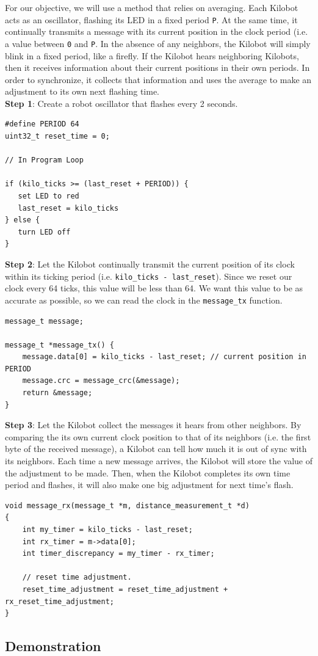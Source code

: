 \documentclass{report}[12pt]
\begin{document}
\noindent For our objective, we will use a method that relies on averaging. Each Kilobot acts as an oscillator, flashing its LED in a fixed period \texttt{P}. At the same time, it continually transmits a message with its current position in the clock period (i.e. a value between \texttt{0} and \texttt{P}. In the absence of any neighbors, the Kilobot will simply blink in a fixed period, like a firefly. If the Kilobot hears neighboring Kilobots, then it receives information about their current positions in their own periods. In order to synchronize, it collects that information and uses the average to make an adjustment to its own next flashing time. \\

\noindent \textbf{Step 1}: Create a robot oscillator that flashes every 2 seconds.
\begin{verbatim}
#define PERIOD 64
uint32_t reset_time = 0;

// In Program Loop

if (kilo_ticks >= (last_reset + PERIOD)) {
   set LED to red
   last_reset = kilo_ticks
} else {
   turn LED off
}
\end{verbatim}

\noindent \textbf{Step  2}: Let the Kilobot continually transmit the current position of its clock within its ticking period (i.e. \texttt{kilo\_ticks - last\_reset}). Since we reset our clock every 64 ticks, this value will be less than 64. We want this value to be as accurate as possible, so we can read the clock in the \texttt{message\_tx} function. 
\begin{verbatim}
message_t message;

message_t *message_tx() {
    message.data[0] = kilo_ticks - last_reset; // current position in PERIOD
    message.crc = message_crc(&message);
    return &message;
}
\end{verbatim}

\noindent \textbf{Step 3}: Let the Kilobot collect the messages it hears from other neighbors. 
By comparing the its own current clock position to that of its neighbors (i.e. the first byte of the received message), a Kilobot can tell how much it is out of sync with its neighbors. Each time a new message arrives, the Kilobot will store the value of the adjustment to be made. Then, when the Kilobot completes its own time period and flashes, it will also make one big adjustment for next time's flash.

\begin{verbatim}
void message_rx(message_t *m, distance_measurement_t *d)
{
    int my_timer = kilo_ticks - last_reset;
    int rx_timer = m->data[0];
    int timer_discrepancy = my_timer - rx_timer;
    
    // reset time adjustment.
    reset_time_adjustment = reset_time_adjustment + 	rx_reset_time_adjustment;
}
\end{verbatim}

\subsection{Demonstration}

{}

\end{document}
